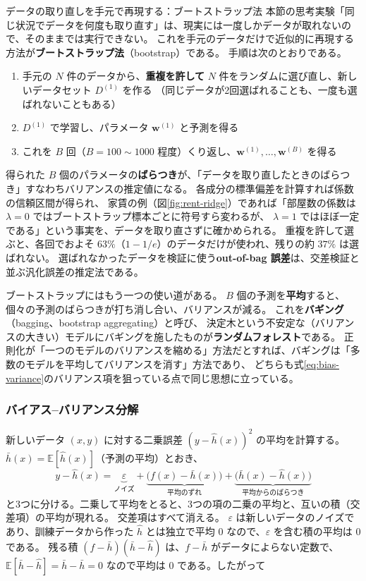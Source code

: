 \begin{mlcolumn}{データの取り直しを手元で再現する：ブートストラップ法}
本節の思考実験「同じ状況でデータを何度も取り直す」は、現実には一度しかデータが取れないので、そのままでは実行できない。
これを手元のデータだけで近似的に再現する方法が\textbf{ブートストラップ法}（bootstrap）である。
手順は次のとおりである。
\begin{enumerate}
  \item 手元の $N$ 件のデータから、\textbf{重複を許して} $N$ 件をランダムに選び直し、新しいデータセット $D^{(1)}$ を作る
    （同じデータが2回選ばれることも、一度も選ばれないこともある）
  \item $D^{(1)}$ で学習し、パラメータ $\bm{w}^{(1)}$ と予測を得る
  \item これを $B$ 回（$B = 100 \sim 1000$ 程度）くり返し、$\bm{w}^{(1)}, \ldots, \bm{w}^{(B)}$ を得る
\end{enumerate}
得られた $B$ 個のパラメータの\textbf{ばらつき}が、「データを取り直したときのばらつき」すなわちバリアンスの推定値になる。
各成分の標準偏差を計算すれば係数の信頼区間が得られ、
家賃の例（図\ref{fig:rent-ridge}）であれば「部屋数の係数は $\lambda = 0$ ではブートストラップ標本ごとに符号すら変わるが、
$\lambda = 1$ ではほぼ一定である」という事実を、データを取り直さずに確かめられる。
重複を許して選ぶと、各回でおよそ $63\%$（$1 - 1/e$）のデータだけが使われ、残りの約 $37\%$ は選ばれない。
選ばれなかったデータを検証に使う\textbf{out-of-bag 誤差}は、交差検証と並ぶ汎化誤差の推定法である。

ブートストラップにはもう一つの使い道がある。
$B$ 個の予測を\textbf{平均}すると、個々の予測のばらつきが打ち消し合い、バリアンスが減る。
これを\textbf{バギング}（bagging、bootstrap aggregating）と呼び、
決定木という不安定な（バリアンスの大きい）モデルにバギングを施したものが\textbf{ランダムフォレスト}である。
正則化が「一つのモデルのバリアンスを縮める」方法だとすれば、バギングは「多数のモデルを平均してバリアンスを消す」方法であり、
どちらも式\eqref{eq:bias-variance}のバリアンス項を狙っている点で同じ思想に立っている。
\end{mlcolumn}

\subsubsection{バイアス--バリアンス分解}

新しいデータ $(x, y)$ に対する二乗誤差 $(y - \hat{h}(x))^2$ の平均を計算する。
$\bar{h}(x) = \mathbb{E}[\hat{h}(x)]$（予測の平均）とおき、
\begin{equation*}
  y - \hat{h}(x) = \underbrace{\varepsilon}_{\text{ノイズ}}
  + \underbrace{\bigl( f(x) - \bar{h}(x) \bigr)}_{\text{平均のずれ}}
  + \underbrace{\bigl( \bar{h}(x) - \hat{h}(x) \bigr)}_{\text{平均からのばらつき}}
\end{equation*}
と3つに分ける。二乗して平均をとると、3つの項の二乗の平均と、互いの積（交差項）の平均が現れる。
交差項はすべて消える。
$\varepsilon$ は新しいデータのノイズであり、訓練データから作った $\hat{h}$ とは独立で平均 $0$ なので、$\varepsilon$ を含む積の平均は $0$ である。
残る積 $(f - \bar{h})(\bar{h} - \hat{h})$ は、$f - \bar{h}$ がデータによらない定数で、
$\mathbb{E}[\bar{h} - \hat{h}] = \bar{h} - \bar{h} = 0$ なので平均は $0$ である。したがって

